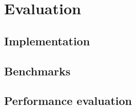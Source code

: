 \section{Evaluation}
\label{sec:evaluate}

\subsection{Implementation}


\subsection{Benchmarks}

\subsection{Performance evaluation}

